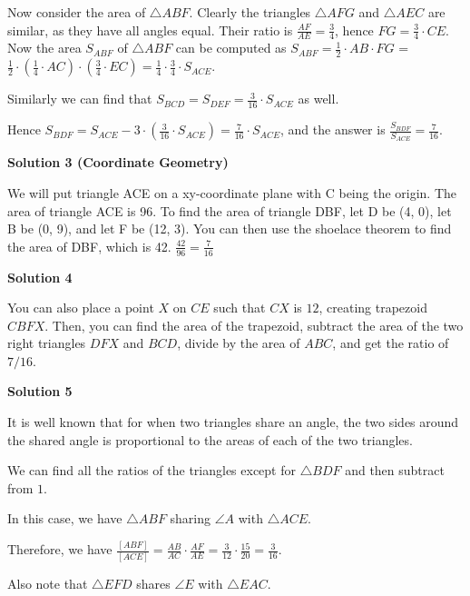 \begin{enumerate}
 Now consider the area of $\triangle ABF$. Clearly the triangles $\triangle AFG$ and $\triangle AEC$ are similar, as they have all angles equal. Their ratio is $\frac {AF}{AE} = \frac 34$, hence $FG = \frac 34 \cdot CE$. Now the area $S_{ABF}$ of $\triangle ABF$ can be computed as $S_{ABF} = \frac 12 \cdot AB \cdot FG$ = $\frac 12 \cdot \left( \frac 14 \cdot AC \right) \cdot \left( \frac 34 \cdot EC \right) = \frac 14 \cdot \frac 34 \cdot S_{ACE}$.

 Similarly we can find that $S_{BCD} = S_{DEF} = \frac 3{16}\cdot S_{ACE}$ as well. 

 Hence $S_{BDF} = S_{ACE} - 3\cdot\left( \frac 3{16} \cdot S_{ACE} \right) = \frac 7{16} \cdot S_{ACE}$, and the answer is $\frac{S_{BDF}}{S_{ACE}} = \boxed{\frac 7{16}}$.

 



\textbf{Solution 3 (Coordinate Geometry)}

We will put triangle ACE on a xy-coordinate plane with C being the origin. The area of triangle ACE is 96. To find the area of triangle DBF, let D be (4, 0), let B be (0, 9), and let F be (12, 3). You can then use the shoelace theorem to find the area of DBF, which is 42. $\frac {42}{96} = \boxed{\frac 7{16}}$




\textbf{Solution 4}

You can also place a point $X$ on $CE$ such that $CX$ is $12$, creating trapezoid $CBFX$. Then, you can find the area of the trapezoid, subtract the area of the two right triangles $DFX$ and $BCD$, divide by the area of $ABC$, and get the ratio of $7/16$.

 



\textbf{Solution 5}

It is well known that for when two triangles share an angle, the two sides around the shared angle is proportional to the areas of each of the two triangles. 

 We can find all the ratios of the triangles except for $\triangle{BDF}$ and then subtract from $1.$

 In this case, we have $\triangle{ABF}$ sharing $\angle{A}$ with $\triangle{ACE}$.

 Therefore, we have $\frac{[ABF]}{[ACE]}=\frac{AB}{AC} \cdot \frac{AF}{AE} = \frac{3}{12} \cdot \frac{15}{20} = \frac{3}{16}.$

 Also note that $\triangle{EFD}$ shares $\angle{E}$ with $\triangle{EAC}$.


\end{enumerate}
